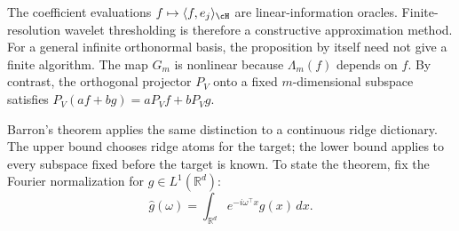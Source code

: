 \documentclass[11pt,twoside]{article}
\newcommand{\R}{\mathbb R}
\theoremstyle{definition}
\theoremstyle{remark}
\begin{document}
The coefficient evaluations
\(f\mapsto\langle f,e_j\rangle_{\cH}\) are linear-information oracles.
Finite-resolution wavelet thresholding is therefore a constructive
approximation method. For a general infinite orthonormal basis, the
proposition by itself need not give a finite algorithm.%
The map \(G_m\) is nonlinear because \(\Lambda_m(f)\) depends on \(f\). By
contrast, the orthogonal projector \(P_V\) onto a fixed \(m\)-dimensional
subspace satisfies
\(P_V(af+bg)=aP_Vf+bP_Vg\).

Barron's theorem applies the same distinction to a continuous ridge
dictionary. The upper bound chooses ridge atoms for the target; the lower bound
applies to every subspace fixed before the target is known. To state the
theorem, fix the Fourier normalization for \(g\in L^1(\R^d)\):
\begin{equation}
 \widehat g(\omega)=\int_{\R^d}e^{-i\omega^\top x}g(x)\,dx.
 \label{eq:fourier-transform}
\end{equation}
\end{document}
